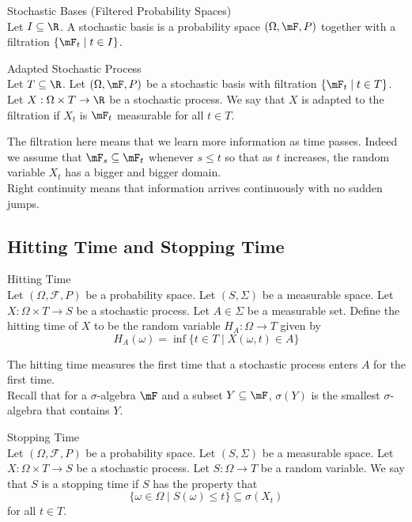 \documentclass[a4paper]{article}
\begin{document}
\begin{defn}{Stochastic Bases (Filtered Probability Spaces)}{}\\
Let $I\subseteq\R$. A stochastic basis is a probability space $(\Omega,\mF,P)$ together with a filtration $\{\mF_t\;|\;t\in I\}$. 
\end{defn}

\begin{defn}{Adapted Stochastic Process}{}\\
Let $T\subseteq\R$. Let $(\Omega,\mF,P)$ be a stochastic basis with filtration $\{\mF_t\;|\;t\in T\}$. Let $X:\Omega\times T\to\R$ be a stochastic process. We say that $X$ is adapted to the filtration if $X_t$ is $\mF_t$ measurable for all $t\in T$. 
\end{defn}

The filtration here means that we learn more information as time passes. Indeed we assume that $\mF_s\subseteq\mF_t$ whenever $s\leq t$ so that as $t$ increases, the random variable $X_t$ has a bigger and bigger domain. \\

Right continuity means that information arrives continuously with no sudden jumps. 

\subsection{Hitting Time and Stopping Time}
\begin{defn}{Hitting Time}{}\\
Let $(\Omega,\mathcal{F},P)$ be a probability space. Let $(S,\Sigma)$ be a measurable space. Let $X:\Omega\times T\to S$ be a stochastic process. Let $A\in\Sigma$ be a measurable set. Define the hitting time of $X$ to be the random variable $H_A:\Omega\to T$ given by $$H_A(\omega)=\inf\{t\in T\;|\;X(\omega,t)\in A\}$$
\end{defn}

The hitting time measures the first time that a stochastic process enters $A$ for the first time. \\

Recall that for a $\sigma$-algebra $\mF$ and a subset $Y\subseteq\mF$, $\sigma(Y)$ is the smallest $\sigma$-algebra that contains $Y$. 

\begin{defn}{Stopping Time}{}\\
Let $(\Omega,\mathcal{F},P)$ be a probability space. Let $(S,\Sigma)$ be a measurable space. Let $X:\Omega\times T\to S$ be a stochastic process. Let $S:\Omega\to T$ be a random variable. We say that $S$ is a stopping time if $S$ has the property that $$\{\omega\in\Omega\;|\;S(\omega)\leq t\}\subseteq\sigma(X_t)$$ for all $t\in T$. 
\end{defn}
\end{document}
